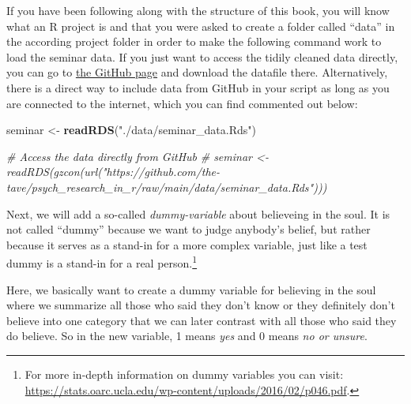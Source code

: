 \documentclass[
]{book}
\newenvironment{Shaded}{\begin{snugshade}}{\end{snugshade}}
\newcommand{\CommentTok}[1]{\textcolor[rgb]{0.56,0.35,0.01}{\textit{#1}}}
\newcommand{\DecValTok}[1]{\textcolor[rgb]{0.00,0.00,0.81}{#1}}
\newcommand{\FunctionTok}[1]{\textcolor[rgb]{0.13,0.29,0.53}{\textbf{#1}}}
\newcommand{\NormalTok}[1]{#1}
\newcommand{\OtherTok}[1]{\textcolor[rgb]{0.56,0.35,0.01}{#1}}
\newcommand{\SpecialCharTok}[1]{\textcolor[rgb]{0.81,0.36,0.00}{\textbf{#1}}}
\newcommand{\StringTok}[1]{\textcolor[rgb]{0.31,0.60,0.02}{#1}}
\begin{document}
If you have been following along with the structure of this book, you will know what an R project is and that you were asked to create a folder called ``data'' in the according project folder in order to make the following command work to load the seminar data.
If you just want to access the tidily cleaned data directly, you can go to \href{https://github.com/the-tave/psych_research_in_r/blob/main/data/seminar_data.Rds}{the GitHub page} and download the datafile there.
Alternatively, there is a direct way to include data from GitHub in your script as long as you are connected to the internet, which you can find commented out below:

\begin{Shaded}
\begin{Highlighting}[]
\NormalTok{seminar }\OtherTok{\textless{}{-}} \FunctionTok{readRDS}\NormalTok{(}\StringTok{"./data/seminar\_data.Rds"}\NormalTok{)}

\CommentTok{\# Access the data directly from GitHub}
\CommentTok{\# seminar \textless{}{-} readRDS(gzcon(url("https://github.com/the{-}tave/psych\_research\_in\_r/raw/main/data/seminar\_data.Rds")))}
\end{Highlighting}
\end{Shaded}

Next, we will add a so-called \emph{dummy-variable} about believeing in the soul.
It is not called ``dummy'' because we want to judge anybody's belief, but rather because it serves as a stand-in for a more complex variable, just like a test dummy is a stand-in for a real person.\footnote{For more in-depth information on dummy variables you can visit: \url{https://stats.oarc.ucla.edu/wp-content/uploads/2016/02/p046.pdf}.}

Here, we basically want to create a dummy variable for believing in the soul where we summarize all those who said they don't know or they definitely don't believe into one category that we can later contrast with all those who said they do believe.
So in the new variable, 1 means \emph{yes} and 0 means \emph{no or unsure}.

\begin{Shaded}
\end{Shaded}
\end{document}
